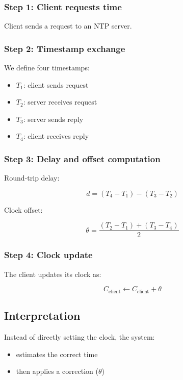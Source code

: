 \subsubsection{Step 1: Client requests time}

Client sends a request to an NTP server.



\subsubsection{Step 2: Timestamp exchange}

We define four timestamps:

\begin{itemize}
    \item \(T_1\): client sends request
    \item \(T_2\): server receives request
    \item \(T_3\): server sends reply
    \item \(T_4\): client receives reply
\end{itemize}



\subsubsection{Step 3: Delay and offset computation}

Round-trip delay:

\[
d = (T_4 - T_1) - (T_3 - T_2)
\]

Clock offset:

\[
\theta =
\frac{(T_2 - T_1) + (T_3 - T_4)}{2}
\]



\subsubsection{Step 4: Clock update}

The client updates its clock as:

\[
C_{\text{client}} \leftarrow C_{\text{client}} + \theta
\]



\subsection{Interpretation}

Instead of directly setting the clock, the system:

\begin{itemize}
    \item estimates the correct time
    \item then applies a correction (\(\theta\))
\end{itemize}

